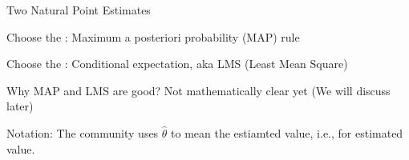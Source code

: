
\begin{frame}{Two Natural Point Estimates}

\vspace{-0.6cm}
\vspace{-0.6cm}

\plitemsep 0.05in
\bci

\item<2->[M1.] Choose the : Maximum a posteriori probability (MAP) rule

\begin{center}
\end{center}

\item<4->[M2.] Choose the : Conditional expectation, aka LMS (Least Mean Square)

\begin{center}
\end{center}

\item<6-> Why MAP and LMS are good? Not mathematically clear yet (We
  will discuss later)

\item<7-> Notation: The community uses $\hat{\theta}$ to mean the
  estiamted value, i.e.,  for estimated value.   





\eci

\end{frame}


